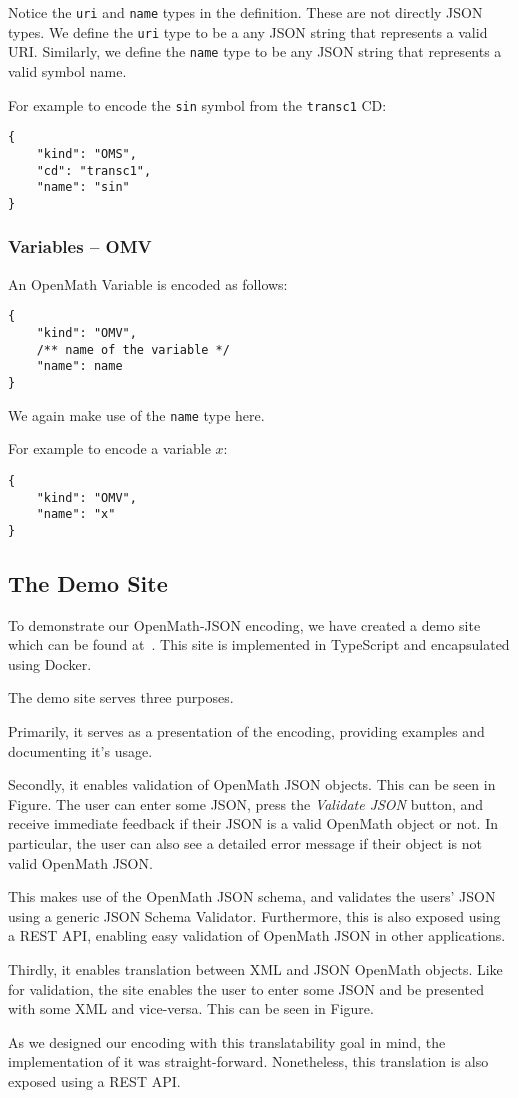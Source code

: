 Notice the \texttt{uri} and \texttt{name} types in the definition. 
These are not directly JSON types. 
We define the \texttt{uri} type to be a any JSON string that represents a valid URI. 
Similarly, we define the \texttt{name} type to be any JSON string that represents a valid symbol name. 

For example to encode the \texttt{sin} symbol from the \texttt{transc1} CD:
\begin{lstlisting}
{
    "kind": "OMS",
    "cd": "transc1",
    "name": "sin"
}
\end{lstlisting}

\subsubsection{Variables -- OMV}

An OpenMath Variable is encoded as follows:
\begin{lstlisting}
{
    "kind": "OMV",
    /** name of the variable */
    "name": name
}
\end{lstlisting}

We again make use of the \texttt{name} type here. 

For example to encode a variable $x$:
\begin{lstlisting}
{
    "kind": "OMV",
    "name": "x"
}
\end{lstlisting}

\subsection{The Demo Site}

To demonstrate our OpenMath-JSON encoding, we have created a demo site which can be found at~\cite{openmathjson:web}. 
This site is implemented in TypeScript and encapsulated using Docker\cite{docker:webpage}. 

The demo site serves three purposes.

Primarily, it serves as a presentation of the encoding, providing examples and documenting it's usage. 

Secondly, it enables validation of OpenMath JSON objects. This can be seen in Figure.
The user can enter some JSON, press the \textit{Validate JSON} button, and receive immediate feedback if their JSON is a valid OpenMath object or not. 
In particular, the user can also see a detailed error message if their object is not valid OpenMath JSON. 

This makes use of the OpenMath JSON schema, and validates the users' JSON using a generic JSON Schema Validator. 
Furthermore, this is also exposed using a REST API, enabling easy validation of OpenMath JSON in other applications. 

Thirdly, it enables translation between XML and JSON OpenMath objects. 
Like for validation, the site enables the user to enter some JSON and be presented with some XML and vice-versa. 
This can be seen in Figure.

As we designed our encoding with this translatability goal in mind, the implementation of it was straight-forward. 
Nonetheless, this translation is also exposed using a REST API. 
